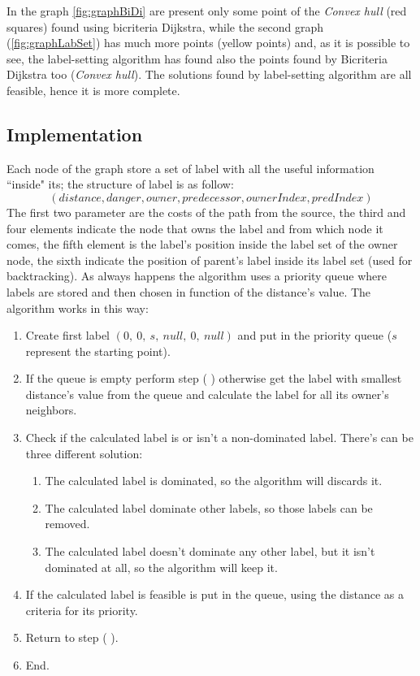 \documentclass[a4paper,11pt]{report}
\newcommand{\RN}[1]{%
	\textup{\lowercase\expandafter{\romannumeral#1}}%
}
\begin{document}
In the graph \ref{fig:graphBiDi} are present only some point of the \textit{Convex hull} (red squares) found using bicriteria Dijkstra, while the second graph (\ref{fig:graphLabSet}) has much more points (yellow points) and, as it is possible to see, the label-setting algorithm has found also the points found by Bicriteria Dijkstra too (\textit{Convex hull}). The solutions found by label-setting algorithm are all feasible, hence it is more complete.

\subsection{Implementation}
Each node of the graph store a set of label with all the useful information ``inside" its; the structure of label is as follow:
$$(distance, danger, owner, predecessor, ownerIndex, predIndex)$$
The first two parameter are the costs of the path from the source, the third and four elements indicate the node that owns the label and from which node it comes, the fifth element is the label's position inside the label set of the owner node, the sixth indicate the position of parent's label inside its label set (used for backtracking).
As always happens the algorithm uses a priority queue where labels are stored and then chosen in function of the distance's value. The algorithm works in this way:

\begin{enumerate}[label=\roman*.]
	\item Create first label $(0,\ 0,\ s,\ null,\ 0,\ null)$ and put in the priority queue ($s$ represent the starting point).
	\item If the queue is empty perform step (\RN{6}) otherwise get the label with smallest distance's value from the queue and calculate the label for all its owner's neighbors.
	\item Check if the calculated label is or isn't a non-dominated label. There's can be three different solution: 
	\begin{enumerate}
		\item The calculated label is dominated, so the algorithm will discards it.
		\item The calculated label dominate other labels, so those labels can be removed.
		\item The calculated label doesn't dominate any other label, but it isn't dominated at all, so the algorithm will keep it.
	\end{enumerate}
	\item If the calculated label is feasible is put in the queue, using the distance as a criteria for its priority.
	\item Return to step (\RN{2}).
	\item End.
\end{enumerate}
\end{document}
